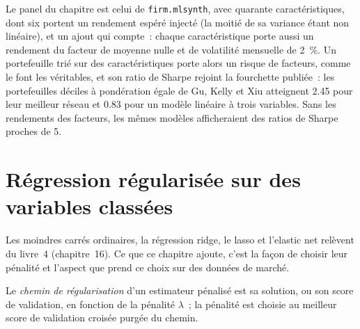 Le panel du chapitre est celui de \texttt{firm.mlsynth}, avec quarante caractéristiques, dont six portent un rendement espéré injecté
(la moitié de sa variance étant non linéaire), et un ajout qui compte~: chaque caractéristique porte aussi un rendement du facteur
de moyenne nulle et de volatilité mensuelle de 2~\%. Un portefeuille trié sur des caractéristiques porte alors un risque de facteurs, comme le font les véritables,
et son ratio de Sharpe rejoint la fourchette publiée~: les portefeuilles déciles à pondération égale de Gu, Kelly et Xiu atteignent 2.45
pour leur meilleur réseau et 0.83 pour un modèle linéaire à trois variables. Sans les rendements des facteurs, les mêmes modèles
afficheraient des ratios de Sharpe proches de 5.

\section{Régression régularisée sur des variables classées}

Les moindres carrés ordinaires, la régression ridge, le lasso et l'elastic net relèvent du livre~4 (chapitre~16). Ce que ce chapitre
ajoute, c'est la façon de choisir leur pénalité et l'aspect que prend ce choix sur des données de marché.

\begin{definition}\label{def:ml:linear-and-regularised-baselines:path}
Le \emph{chemin de régularisation} d'un estimateur pénalisé est sa solution, ou son score de validation,
en fonction de la pénalité $\lambda$~; la pénalité est choisie au meilleur score de validation croisée purgée du chemin.
\end{definition}

